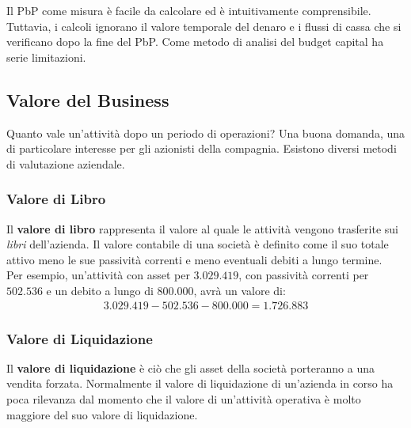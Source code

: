 \documentclass[a4paper,portrait,12pt]{article}
\theoremstyle{definition}
\begin{document}
Il PbP come misura è facile da calcolare ed è intuitivamente comprensibile.
Tuttavia, i calcoli ignorano il valore temporale del denaro e i flussi di cassa che si verificano dopo la fine del PbP.
Come metodo di analisi del budget capital ha serie limitazioni.


\subsection{Valore del Business}


Quanto vale un'attività dopo un periodo di operazioni?
Una buona domanda, una di particolare interesse per gli azionisti della compagnia.
Esistono diversi metodi di valutazione aziendale.

\subsubsection{Valore di Libro}

Il \textbf{valore di libro} rappresenta il valore al quale le attività vengono trasferite sui \emph{libri} dell'azienda.
Il valore contabile di una società è definito come il suo totale attivo meno le sue passività correnti e meno eventuali debiti a lungo termine.\\

Per esempio, un'attività con asset per $3.029.419$, con passività correnti per $502.536$ e un debito a lungo di $800.000$, avrà un valore di:
\begin{align*}
3.029.419 - 502.536 - 800.000 = 1.726.883
\end{align*}

\subsubsection{Valore di Liquidazione}

Il \textbf{valore di liquidazione} è ciò che gli asset della società porteranno a una vendita forzata.
Normalmente il valore di liquidazione di un'azienda in corso ha poca rilevanza dal momento che il valore di un'attività operativa è molto maggiore del suo valore di liquidazione.

\end{document}
